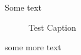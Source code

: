 \documentclass[10pt]{article}
\begin{document}
Some text
\begin{figure}[!ht]
	\centering
	\fbox{\rule{0pt}{2in} \rule{0.9\linewidth}{0pt}}
	\caption{Test Caption}
\end{figure} 

some more text
\end{document}

